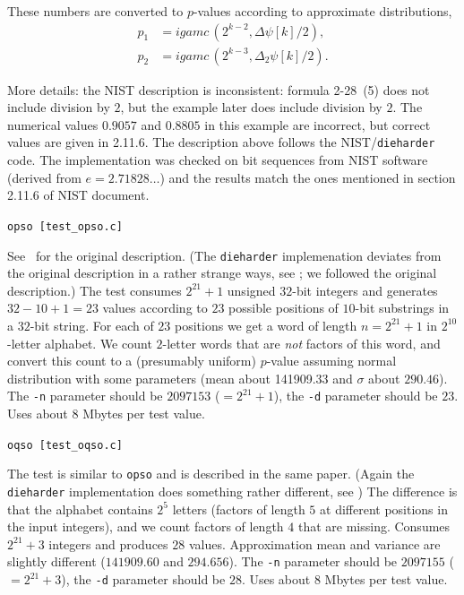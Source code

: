 \documentclass[12pt,a4paper,fullpage]{article}
\begin{document}
\begin{description}
These numbers are converted to $p$-values according to approximate distributions,
\begin{align*}
    p_1 &= \textit{igamc}\,(2^{k-2},\Delta\psi[k]/2),\\
    p_2 &= \textit{igamc}\,(2^{k-3},\Delta_2\psi[k]/2).
\end{align*}   

More details:  the NIST description is inconsistent: formula 2-28~(5) does not include division by $2$, but the example later does include division by $2$. The numerical values  $0.9057$ and $0.8805$ in this example are incorrect, but correct values are given in 2.11.6. The description above follows the NIST/\texttt{dieharder} code. The implementation was checked on bit sequences from NIST software (derived from $e=2.71828\ldots$) and the results match the ones mentioned in section 2.11.6 of NIST document.

\item[4] \texttt{opso [test\_opso.c]}

See~\cite{marsaglia-zaman} for the original description. (The \texttt{dieharder} implemenation deviates from the original description in a rather strange ways, see \cite[Section 7.1]{shen-romashchenko-robust}; we followed the original description.) The test consumes $2^{21}+1$ unsigned $32$-bit integers and generates $32-10+1=23$ values according to $23$ possible positions of $10$-bit substrings in a $32$-bit string. For each of $23$ positions we get a word of length $n=2^{21}+1$ in $2^{10}$-letter alphabet. We count $2$-letter words that are \emph{not} factors of this word, and convert this count to a  (presumably uniform) $p$-value assuming normal distribution with some parameters (mean about 141909.33 and $\sigma$ about $290.46$). The \texttt{-n} parameter should be $2097153$ (${}=2^{21}+1$), the \texttt{-d} parameter should be $23$. Uses about $8$ Mbytes per test value.

\item[5] \texttt{oqso [test\_oqso.c]}

The test is similar to \texttt{opso} and is described in the same paper. (Again the \texttt{dieharder} implementation does something rather different,  see \cite[Section 7.1]{shen-romashchenko-robust}) The difference is that the alphabet contains $2^5$ letters (factors of length $5$ at different positions in the input integers), and we count factors of length $4$ that are missing. Consumes $2^{21}+3$ integers and produces $28$ values. Approximation mean and variance are slightly different ($141909.60$ and $294.656$). The \texttt{-n} parameter should be $2097155$ (${}=2^{21}+3$), the \texttt{-d} parameter should be $28$. Uses about $8$ Mbytes per test value.


\end{description}
\end{document}
